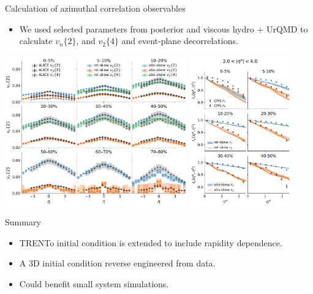 \documentclass[11pt]{beamer}
\begin{document}
\begin{frame}{Calculation of azimuthal correlation observables}
\begin{itemize}
\item We used selected parameters from posterior and viscous hydro + UrQMD to calculate $v_n\{2\}$, and $v_2\{4\}$ and event-plane decorrelations.
\end{itemize}
\includegraphics[width=0.59\textwidth]{vn_eta.pdf}\hfill
\includegraphics[width=0.325\textwidth]{evt_pln_decorr_near.pdf}
\end{frame}

\begin{frame}{Summary}
\begin{itemize}
\item TRENTo initial condition is extended to include rapidity dependence.
\item A 3D initial condition reverse engineered from data.
\item Could benefit small system simulations.
\end{itemize}
\end{frame}
\end{document}
